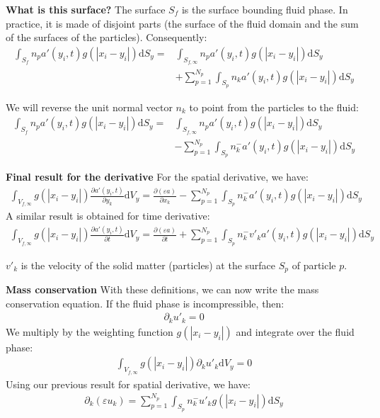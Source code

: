 \documentclass[c,11pt,xcolor=dvipsnames, aspectratio=169]{beamer}
\newcommand{\pp}[1]{\left(#1\right)}
\begin{document}
\begin{frame}{\textbf{What is this surface?}}
The surface $S_f$ is the surface bounding fluid phase. In practice, it is made of disjoint parts (the surface of the fluid domain and the sum of the surfaces of the particles). Consequently:
\begin{align*}
\int_{S_f} n_p a'(y_i,t) g(|x_i-y_i|) \mathrm{d}S_y =  &\int_{S_{f,\infty}} n_p a'(y_i,t) g(|x_i-y_i|) \mathrm{d}S_y \\
&+ \sum_{p=1}^{N_p} \int_{S_{p}} n_k a'(y_i,t) g(|x_i-y_i|) \mathrm{d}S_y
\end{align*}

We will reverse the unit normal vector $n_k$ to point from the particles to the fluid:
\begin{align*}
\int_{S_f} n_p a'(y_i,t) g(|x_i-y_i|) \mathrm{d}S_y =  &\int_{S_{f,\infty}} n_p a'(y_i,t) g(|x_i-y_i|) \mathrm{d}S_y \\
&- \sum_{p=1}^{N_p} \int_{S_{p}} n_k^{-} a'(y_i,t) g(|x_i-y_i|) \mathrm{d}S_y
\end{align*}
\end{frame}

\begin{frame}{\textbf{Final result for the derivative}}
For the spatial derivative, we have:
\begin{align*}
		\int_{V_{f,\infty}} g(|x_i-y_i|) \frac{\partial a'(y_i,t)}{\partial y_k} \mathrm{d}V_y   = \frac{\partial \pp{\varepsilon a}}{\partial x_k} - \sum_{p=1}^{N_p} \int_{S_{p}} n_k^{-} a'(y_i,t) g(|x_i-y_i|) \mathrm{d}S_y 
\end{align*}
A similar result is obtained for time derivative:
\begin{align*}
		\int_{V_{f,\infty}} g(|x_i-y_i|) \frac{\partial a'(y_i,t)}{\partial t} \mathrm{d}V_y   = \frac{\partial \pp{\varepsilon a}}{\partial t} +\sum_{p=1}^{N_p} \int_{S_{p}} n_k^{-} v'_k a'(y_i,t) g(|x_i-y_i|) \mathrm{d}S_y 
\end{align*}

$v'_{k}$ is the velocity of the solid matter (particles) at the surface $S_p$ of particle $p$.
\end{frame}


\begin{frame}{\textbf{Mass conservation}}
With these definitions, we can now write the mass conservation equation. If the fluid phase is incompressible, then:
\begin{align*}
\partial_k u'_k = 0 
\end{align*}
We multiply by the weighting function $g(|x_i-y_i|)$ and integrate over the fluid phase:
\begin{align*}
\int_{V_{f,\infty}} g(|x_i-y_i|) \partial_k u'_k \mathrm{d}V_y = 0
\end{align*}
Using our previous result for spatial derivative, we have:
\begin{align*}
\partial_k \pp{\varepsilon u_k} = \sum_{p=1}^{N_p} \int_{S_{p}} n_k^{-} u'_k g(|x_i-y_i|) \mathrm{d}S_y 
\end{align*}
\end{frame}
\end{document}

